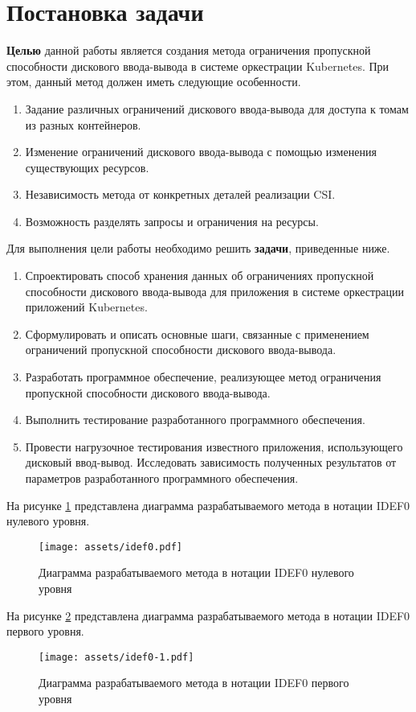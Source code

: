 \section{Постановка задачи}

\textbf{Целью} данной работы является создания метода ограничения пропускной способности дискового ввода-вывода в системе оркестрации Kubernetes. При этом, данный метод должен иметь следующие особенности.

\begin{enumerate}
	\item Задание различных ограничений дискового ввода-вывода для доступа к томам из разных контейнеров.
	\item Изменение ограничений дискового ввода-вывода с помощью изменения существующих ресурсов.
	\item Независимость метода от конкретных деталей реализации CSI.
	\item Возможность разделять запросы и ограничения на ресурсы.
\end{enumerate}

Для выполнения цели работы необходимо решить \textbf{задачи}, приведенные ниже.

\begin{enumerate}
	\item Спроектировать способ хранения данных об ограничениях пропускной способности дискового ввода-вывода для приложения в системе оркестрации приложений Kubernetes.
	\item Сформулировать и описать основные шаги, связанные с применением ограничений пропускной способности дискового ввода-вывода.
	\item Разработать программное обеспечение, реализующее метод ограничения пропускной способности дискового ввода-вывода.
	\item Выполнить тестирование разработанного программного обеспечения.
	\item Провести нагрузочное тестирования известного приложения, использующего дисковый ввод-вывод. Исследовать зависимость полученных результатов от параметров разработанного программного обеспечения.
\end{enumerate}

На рисунке \ref{img:idef0} представлена диаграмма разрабатываемого метода в нотации IDEF0 нулевого уровня.

\begin{figure}[h!]
    \centering
    \texttt{[image: assets/idef0.pdf]}
    \caption{Диаграмма разрабатываемого метода в нотации IDEF0 нулевого уровня}
    \label{img:idef0}
\end{figure}

На рисунке \ref{img:idef0-1} представлена диаграмма разрабатываемого метода в нотации IDEF0 первого уровня.

\newpage

\begin{figure}[h!]
    \centering
    \texttt{[image: assets/idef0-1.pdf]}
    \caption{Диаграмма разрабатываемого метода в нотации IDEF0 первого уровня}
    \label{img:idef0-1}
\end{figure}